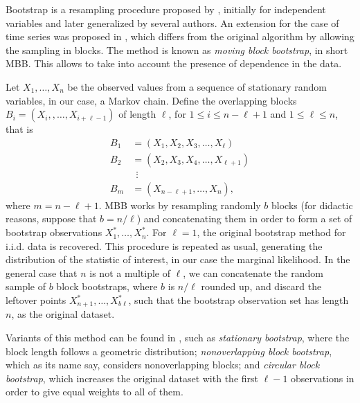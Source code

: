 \documentclass[aps,reprint,amsmath,amssymb,showpacs,showkeys]{revtex4-1}%
\newcommand{\cb}{ \color{blue}}
\begin{document}
	

Bootstrap is a resampling procedure proposed by \cite{Efron:1979}, initially for independent variables and later generalized by several authors.  An extension for the case of time series was proposed in \cite{Kunsch:1989}, which differs from the original algorithm by allowing the sampling in blocks.  The method is known as \textit{moving block bootstrap}, in short MBB.  This allows to take into account the presence of dependence in the data.

Let $X_1, \dots, X_n$ be the observed values from a sequence of stationary random variables, in our case, a Markov chain.  Define the overlapping blocks  $B_i = (X_i, ,\dots,X_{i+\ell-1})$ of length $\ell$, for $1\leq i \leq n-\ell + 1$ and $1 \leq \ell \leq n$, that is
\begin{align*}
B_1 &= (X_1, X_2, X_3, \dots, X_{\ell}) \\
B_2 &= (X_2, X_3, X_4, \dots, X_{\ell + 1}) \\
&\:\:\vdots\\
B_m &= (X_{n-\ell +1}, \dots, X_{n}), 
\end{align*} 
where $m = n - \ell +1$.  MBB works by resampling randomly $b$ blocks (for didactic reasons, suppose that $b = n/\ell$) and concatenating them in order to form a set of bootstrap observations $X^*_1,\dots,X^*_n$.  For $\ell = 1$, the original bootstrap method for i.i.d. data is recovered.  This procedure is repeated as usual, generating the distribution of the statistic of interest, in our case the marginal likelihood.  In the general case that $n$ is not a multiple of $\ell$, we can concatenate the random sample of $b$ block bootstraps, where $b$ is $n/\ell$ rounded up, and discard the leftover points $X^*_{n+1}, \dots, X^*_{b\ell}$, such that the bootstrap observation set has length $n$, as the original dataset.

Variants of this method can be found in \cite{Lahiri:2003}, such as \textit{stationary bootstrap}, where the block length follows a geometric distribution;  \textit{nonoverlapping block bootstrap}, which as its name say, considers nonoverlapping blocks; and \textit{circular block bootstrap}, which increases the original dataset with the first $\ell - 1$ observations in order to give equal weights to all of them. 
\end{document}
